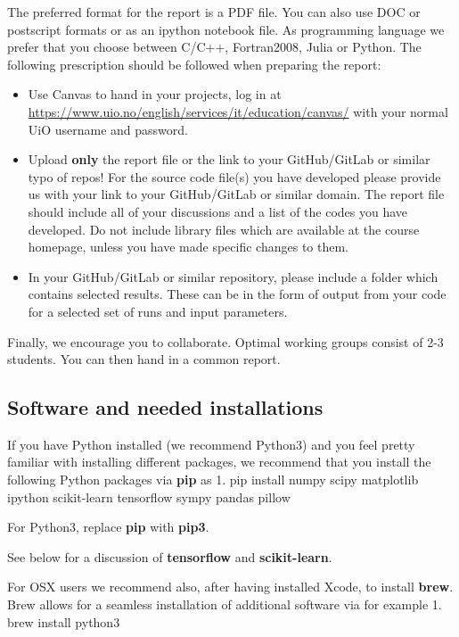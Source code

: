 \documentclass[11pt]{article}
\begin{document}
The preferred format for the report is a PDF file. You can also use DOC
or postscript formats or as an ipython notebook file. As programming
language we prefer that you choose between C/C++, Fortran2008, Julia or
Python. The following prescription should be followed when preparing the
report:

\begin{itemize}
\item
  Use Canvas to hand in your projects, log in at
  \url{https://www.uio.no/english/services/it/education/canvas/} with
  your normal UiO username and password.
\item
  Upload \textbf{only} the report file or the link to your GitHub/GitLab
  or similar typo of repos! For the source code file(s) you have
  developed please provide us with your link to your GitHub/GitLab or
  similar domain. The report file should include all of your discussions
  and a list of the codes you have developed. Do not include library
  files which are available at the course homepage, unless you have made
  specific changes to them.
\item
  In your GitHub/GitLab or similar repository, please include a folder
  which contains selected results. These can be in the form of output
  from your code for a selected set of runs and input parameters.
\end{itemize}

Finally, we encourage you to collaborate. Optimal working groups consist
of 2-3 students. You can then hand in a common report.

    \hypertarget{software-and-needed-installations}{%
\subsection*{Software and needed
installations}\label{software-and-needed-installations}}

If you have Python installed (we recommend Python3) and you feel pretty
familiar with installing different packages, we recommend that you
install the following Python packages via \textbf{pip} as 1. pip install
numpy scipy matplotlib ipython scikit-learn tensorflow sympy pandas
pillow

For Python3, replace \textbf{pip} with \textbf{pip3}.

See below for a discussion of \textbf{tensorflow} and
\textbf{scikit-learn}.

For OSX users we recommend also, after having installed Xcode, to
install \textbf{brew}. Brew allows for a seamless installation of
additional software via for example 1. brew install python3
\end{document}
